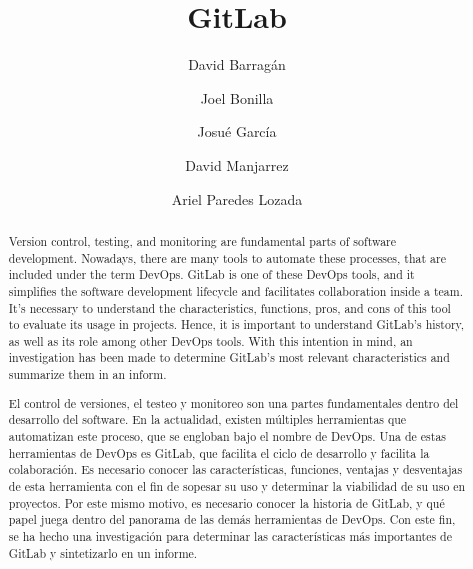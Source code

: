 \documentclass[runningheads]{llncs}
\begin{document}
\title{GitLab}
\author{David Barragán \and
        Joel Bonilla \and
        Josué García \and
        David Manjarrez \and
        Ariel Paredes Lozada
        }

\maketitle
{}
\begin{abstract}
        Version control, testing, and monitoring are fundamental parts of software development.
        Nowadays, there are many tools to automate these processes, that are included under the
        term DevOps. GitLab is one of these DevOps tools, and it simplifies the software development
        lifecycle and facilitates collaboration inside a team. It's necessary to understand the
        characteristics, functions, pros, and cons of this tool to evaluate its usage in
        projects. Hence, it is important to understand GitLab's history, as well as its role among
        other DevOps tools. With this intention in mind, an investigation has been made to determine
        GitLab's most relevant characteristics and summarize them in an inform.
\end{abstract}
\begin{abstract}
        El control de versiones, el testeo y monitoreo son una partes fundamentales dentro del desarrollo del software.
        En la actualidad, existen múltiples herramientas que automatizan este proceso, que se engloban bajo el nombre de DevOps.
        Una de estas herramientas de DevOps es GitLab, que facilita el ciclo de desarrollo y facilita la colaboración.
        Es necesario conocer las características, funciones, ventajas y desventajas de esta herramienta con el fin de 
        sopesar su uso y determinar la viabilidad de su uso en proyectos. Por este mismo motivo, es necesario conocer la
        historia de GitLab, y qué papel juega dentro del panorama de las demás herramientas de DevOps.
        Con este fin, se ha hecho una investigación para determinar las características más importantes de GitLab y
        sintetizarlo en un informe. 
\end{abstract}
\end{document}
